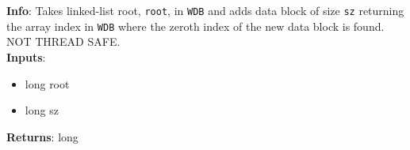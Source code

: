 \textbf{Info}: Takes linked-list root, \texttt{root}, in \texttt{WDB} and adds data
block of size \texttt{sz} returning the array index in \texttt{WDB} where the
zeroth index of the new data block is found. NOT THREAD SAFE. \\

\noindent \textbf{Inputs}:
\begin{itemize}
\item{long root}
\item{long sz}
\end{itemize}

\noindent \textbf{Returns}: long
